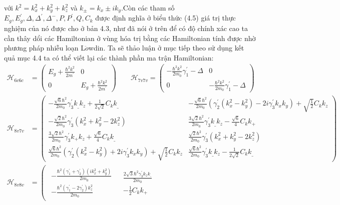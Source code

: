 với $k^2=k_x^2 +k_y^2+k_z^2$ và $k_{\pm}=k_x \pm ik_y$.Còn các tham số $E_g,E_g^{'},\Delta,\Delta^{'},\Delta^{-},P,P^{'},Q,C_k$ được định nghĩa ở biểu thức (4.5) giá trị thực nghiệm của nó được cho ở bản 4.3, như đã nói ở trên để có độ chính xác cao ta cần thây dổi các Hamiltonian ở vùng hóa trị bằng các Hamiltonian tính được nhờ phương pháp nhiễu loạn L$\ddot{o}$wdin. Ta sẽ thảo luận ở mục tiếp theo sử dụng kết quả mục 4.4 ta có thể viết lại các thành phần ma trận Hamiltonian:
\begin{align*}
\mathcal{H}_{6c6c}&=\begin{pmatrix}
E_g +\frac{\hbar^2k^2}{2m^{'}} & 0\\
0 &E_g +\frac{\hbar^2k^2}{2m^{'}}
\end{pmatrix}
\qquad
\mathcal{H}_{7v7v}=\begin{pmatrix}
-\frac{\hbar^2k^2}{2m_0}\gamma_1^{'} -\Delta & 0\\
0 &-\frac{\hbar^2k^2}{2m_0}\gamma_1^{'} -\Delta
\end{pmatrix}
\\
\mathcal{H}_{8v7v}&=\begin{pmatrix}
-\frac{\sqrt{6}\hbar^2}{2m_0}\gamma_3^{'}k_\_k_z +\frac{1}{2\sqrt{2}}C_kk_\_& -\frac{\sqrt{6}\hbar^2}{2m_0}\left(\gamma_2^{'}(k_x^2 - k_y^2) - 2i\gamma_3^{'}k_xk_y\right) +\sqrt{\frac{1}{2}}C_kk_z\\
-\frac{\sqrt{2}\hbar^2}{2m_0}\gamma_3^{'}(k_x^2 +k_y^2 - 2k_z^2) &\frac{3\sqrt{2}\hbar^2}{2m_0}\gamma_3^{'}k_\_k_z -\frac{\sqrt{6}}{4}C_kk_+ \\
\frac{3\sqrt{2}\hbar^2}{2m_0}\gamma_3^{'}k_+k_z +\frac{\sqrt{6}}{4}C_kk_\_ &\frac{\sqrt{2}\hbar^2}{2m_0}\gamma_3^{'}(k_x^2 +k_y^2 - 2k_z^2)\\
\frac{\sqrt{6}\hbar^2}{2m_0}\left(\gamma_2^{'}(k_x^2 - k_y^2) + 2i\gamma_3^{'}k_xk_y\right) +\sqrt{\frac{1}{2}}C_kk_z &\frac{\sqrt{6}\hbar^2}{2m_0}\gamma_3^{'}k_\_k_z - \frac{1}{2\sqrt{2}}C_kk_\_
\end{pmatrix}\\
 \mathcal{H}_{8v8v} &=\left(
 \begin{array}{c|c|c|c}
\begin{array}{c}
-\frac{\hbar^2(\gamma_1^{'} +\gamma_2^{'})(ik_x^2 +k_y^2)}{2m_0}\\
-\frac{\hbar^2(\gamma_1^{'}-2\gamma_2^{'})k_z^2}{2m_0} 
\end{array}
&\begin{array}{c}
 \frac{2\sqrt{3}\hbar^2\gamma_3^{'}k_zk_\_}{2m_0} \\
-\frac{1}{2}C_kk_+

\end{array}
\end{array}
\end{align*}
